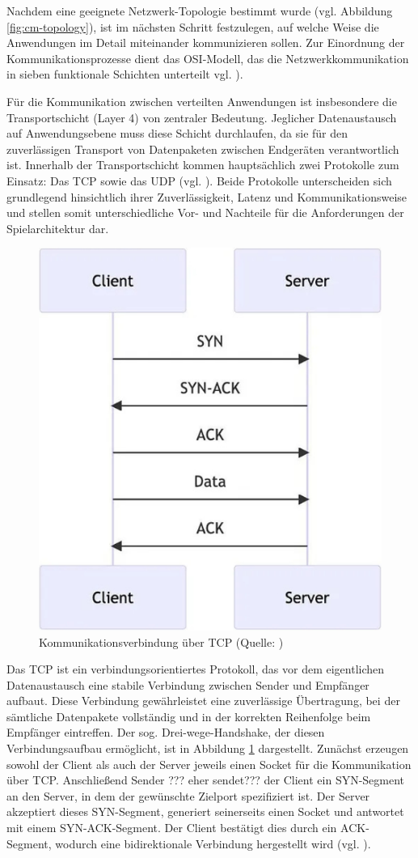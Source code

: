 Nachdem eine geeignete Netzwerk-Topologie bestimmt wurde (vgl. Abbildung \ref{fig:cm-topology}), ist im nächsten Schritt festzulegen, auf welche Weise die Anwendungen im Detail miteinander kommunizieren sollen. Zur Einordnung der Kommunikationsprozesse dient das \ac{OSI}-Modell, das die Netzwerkkommunikation in sieben funktionale Schichten unterteilt vgl. \citealp{noauthor_osi-modell_nodate}).

Für die Kommunikation zwischen verteilten Anwendungen ist insbesondere die Transportschicht (Layer 4) von zentraler Bedeutung. Jeglicher Datenaustausch auf Anwendungsebene muss diese Schicht durchlaufen, da sie für den zuverlässigen Transport von Datenpaketen zwischen Endgeräten verantwortlich ist. Innerhalb der Transportschicht kommen hauptsächlich zwei Protokolle zum Einsatz: Das \ac{TCP} sowie das \ac{UDP} (vgl. \citealp{noauthor_transport_nodate}). Beide Protokolle unterscheiden sich grundlegend hinsichtlich ihrer Zuverlässigkeit, Latenz und Kommunikationsweise und stellen somit unterschiedliche Vor- und Nachteile für die Anforderungen der Spielarchitektur dar.

\begin{figure}[ht]
\centering
\includegraphics[width=0.5\linewidth]{content/pictures/TCP-Network.png}
\caption{Kommunikationsverbindung über TCP (Quelle: \citealp{mygames_unity_2024})}
\label{fig:tcp}
\end{figure}

Das \ac{TCP} ist ein verbindungsorientiertes Protokoll, das vor dem eigentlichen Datenaustausch eine stabile Verbindung zwischen Sender und Empfänger aufbaut. Diese Verbindung gewährleistet eine zuverlässige Übertragung, bei der sämtliche Datenpakete vollständig und in der korrekten Reihenfolge beim Empfänger eintreffen. Der sog. Drei-wege-Handshake, der diesen Verbindungsaufbau ermöglicht, ist in Abbildung \ref{fig:tcp} dargestellt. Zunächst erzeugen sowohl der Client als auch der Server jeweils einen Socket für die Kommunikation über \ac{TCP}. Anschließend Sender  ??? eher  sendet???  der Client ein \ac{SYN}-Segment an den Server, in dem der gewünschte Zielport spezifiziert ist. Der Server akzeptiert dieses \ac{SYN}-Segment, generiert seinerseits einen Socket und antwortet mit einem \ac{SYN}-\ac{ACK}-Segment. Der Client bestätigt dies durch ein \ac{ACK}-Segment, wodurch eine bidirektionale Verbindung hergestellt wird (vgl. \citealp{mygames_unity_2024}).

